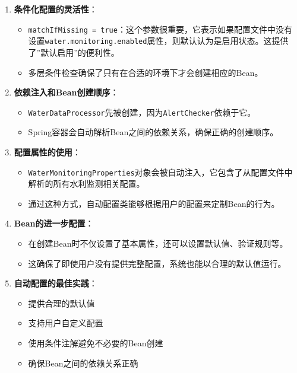 \begin{enumerate}
\def\labelenumi{\arabic{enumi}.}
\tightlist
\item
  \textbf{条件化配置的灵活性}：

  \begin{itemize}
  \tightlist
  \item
    \texttt{matchIfMissing\ =\ true}：这个参数很重要，它表示如果配置文件中没有设置\texttt{water.monitoring.enabled}属性，则默认认为是启用状态。这提供了''默认启用''的便利性。
  \item
    多层条件检查确保了只有在合适的环境下才会创建相应的Bean。
  \end{itemize}
\item
  \textbf{依赖注入和Bean创建顺序}：

  \begin{itemize}
  \tightlist
  \item
    \texttt{WaterDataProcessor}先被创建，因为\texttt{AlertChecker}依赖于它。
  \item
    Spring容器会自动解析Bean之间的依赖关系，确保正确的创建顺序。
  \end{itemize}
\item
  \textbf{配置属性的使用}：

  \begin{itemize}
  \tightlist
  \item
    \texttt{WaterMonitoringProperties}对象会被自动注入，它包含了从配置文件中解析的所有水利监测相关配置。
  \item
    通过这种方式，自动配置类能够根据用户的配置来定制Bean的行为。
  \end{itemize}
\item
  \textbf{Bean的进一步配置}：

  \begin{itemize}
  \tightlist
  \item
    在创建Bean时不仅设置了基本属性，还可以设置默认值、验证规则等。
  \item
    这确保了即使用户没有提供完整配置，系统也能以合理的默认值运行。
  \end{itemize}
\item
  \textbf{自动配置的最佳实践}：

  \begin{itemize}
  \tightlist
  \item
    提供合理的默认值
  \item
    支持用户自定义配置
  \item
    使用条件注解避免不必要的Bean创建
  \item
    确保Bean之间的依赖关系正确
  \end{itemize}
\end{enumerate}

